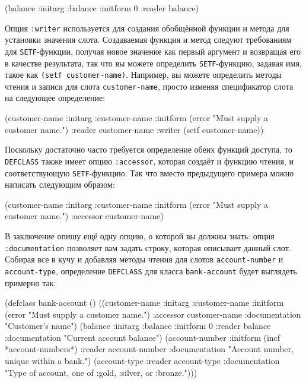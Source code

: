 \begin{myverb}
(balance
 :initarg :balance
 :initform 0
 :reader balance)
\end{myverb}

Опция \lstinline{:writer} используется для создания обобщённой функции и метода для установки
значения слота.  Создаваемая функция и метод следуют требованиям для \lstinline{SETF}-функции,
получая новое значение как первый аргумент и возвращая его в качестве результата, так что
вы можете определить \lstinline{SETF}-функцию, задавая имя, такое как \lstinline{(setf customer-name)}.
Например, вы можете определить методы чтения и записи для слота
\lstinline{customer-name}, просто изменяя спецификатор слота на следующее определение:

\begin{myverb}
(customer-name
 :initarg :customer-name
 :initform (error "Must supply a customer name.")
 :reader customer-name
 :writer (setf customer-name))
\end{myverb}

Поскольку достаточно часто требуется определение обеих функций доступа, то \lstinline{DEFCLASS}
также имеет опцию \lstinline{:accessor}, которая создаёт и функцию чтения, и соответствующую
\lstinline{SETF}-функцию.  Так что вместо предыдущего примера можно написать следующим образом:

\begin{myverb}
(customer-name
 :initarg :customer-name
 :initform (error "Must supply a customer name.")
 :accessor customer-name)
\end{myverb}

В заключение опишу ещё одну опцию, о которой вы должны знать: опция \lstinline{:documentation}
позволяет вам задать строку, которая описывает данный слот.  Собирая все в кучу и добавляя
методы чтения для слотов \lstinline{account-number} и \lstinline{account-type}, определение
\lstinline{DEFCLASS} для класса \lstinline{bank-account} будет выглядеть примерно так:

\begin{myverb}
(defclass bank-account ()
  ((customer-name
    :initarg :customer-name
    :initform (error "Must supply a customer name.")
    :accessor customer-name
    :documentation "Customer's name")
   (balance
    :initarg :balance
    :initform 0
    :reader balance
    :documentation "Current account balance")
   (account-number
    :initform (incf *account-numbers*)
    :reader account-number
    :documentation "Account number, unique within a bank.")
   (account-type
    :reader account-type
    :documentation "Type of account, one of :gold, :silver, or :bronze.")))
\end{myverb}

